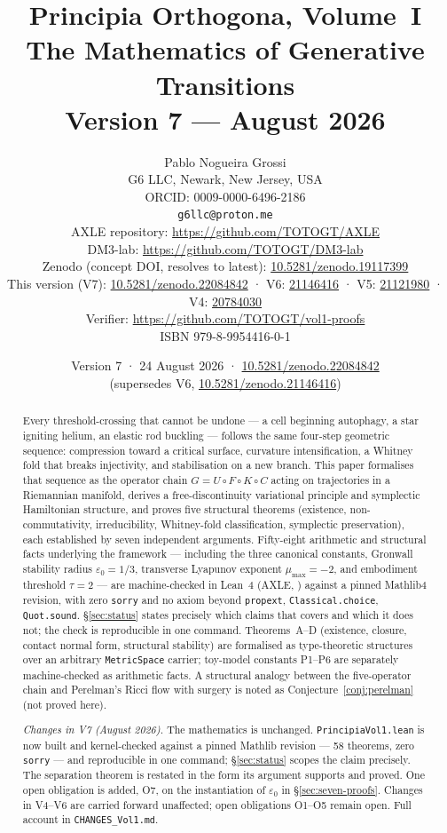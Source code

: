 \documentclass[14pt,a4paper]{extarticle}
\title{%
  \textbf{Principia Orthogona, Volume~I}\\[0.3em]
  \textbf{The Mathematics of Generative Transitions}\\[0.5em]
  \large Version 7 --- August 2026%
}
\author{%
  Pablo Nogueira Grossi\\
  G6 LLC, Newark, New Jersey, USA\\
  ORCID: 0009-0000-6496-2186\\
  \texttt{g6llc@proton.me}\\[0.3em]
  \small AXLE repository: \url{https://github.com/TOTOGT/AXLE}\\
  \small DM3-lab: \url{https://github.com/TOTOGT/DM3-lab}\\
  \small Zenodo (concept DOI, resolves to latest): \href{https://doi.org/10.5281/zenodo.19117399}{10.5281/zenodo.19117399}\\
  \small This version (V7): \href{https://doi.org/10.5281/zenodo.22084842}{10.5281/zenodo.22084842} ·
  V6: \href{https://doi.org/10.5281/zenodo.21146416}{21146416} ·
  V5: \href{https://doi.org/10.5281/zenodo.21121980}{21121980} ·
  V4: \href{https://doi.org/10.5281/zenodo.20784030}{20784030}\\
  \small Verifier: \url{https://github.com/TOTOGT/vol1-proofs}\\
  \small ISBN 979-8-9954416-0-1%
}
\date{Version 7 · 24 August 2026 ·
  \href{https://doi.org/10.5281/zenodo.22084842}{10.5281/zenodo.22084842}\\
  \small (supersedes V6, \href{https://doi.org/10.5281/zenodo.21146416}{10.5281/zenodo.21146416})}
\begin{document}
\maketitle

\begin{abstract}
Every threshold-crossing that cannot be undone ---
a cell beginning autophagy, a star igniting helium, an elastic rod buckling ---
follows the same four-step geometric sequence: compression toward a critical
surface, curvature intensification, a Whitney fold that breaks injectivity,
and stabilisation on a new branch.
This paper formalises that sequence as the operator chain
$G = U \circ F \circ K \circ C$ acting on trajectories in a Riemannian manifold,
derives a free-discontinuity variational principle and symplectic Hamiltonian
structure, and proves five structural theorems (existence, non-commutativity,
irreducibility, Whitney-fold classification, symplectic preservation),
each established by seven independent arguments.
Fifty-eight arithmetic and structural facts underlying the framework ---
including the three canonical constants,
Gronwall stability radius $\varepsilon_0 = 1/3$,
transverse Lyapunov exponent $\mu_{\max} = -2$,
and embodiment threshold $\tau = 2$ ---
are machine-checked in Lean~4 (AXLE, \cite{AXLE2026})
against a pinned Mathlib4 revision, with zero \texttt{sorry} and no axiom
beyond \texttt{propext}, \texttt{Classical.choice}, \texttt{Quot.sound}.
\S\ref{sec:status} states precisely which claims that covers and which it
does not; the check is reproducible in one command.
Theorems~A--D (existence, closure, contact normal form, structural stability)
are formalised as type-theoretic structures over an arbitrary
\texttt{MetricSpace} carrier; toy-model constants P1--P6 are separately
machine-checked as arithmetic facts.
A structural analogy between the five-operator chain and Perelman's Ricci
flow with surgery is noted as Conjecture~\ref{conj:perelman} (not proved here).

\bigskip
\noindent\textit{Changes in V7 (August 2026).}
The mathematics is unchanged. \texttt{PrincipiaVol1.lean} is now built and
kernel-checked against a pinned Mathlib revision --- 58 theorems, zero
\texttt{sorry} --- and reproducible in one command; \S\ref{sec:status} scopes
the claim precisely. The separation theorem is restated in the form its
argument supports and proved. One open obligation is added, O7, on the
instantiation of $\varepsilon_0$ in \S\ref{sec:seven-proofs}. Changes in
V4--V6 are carried forward unaffected; open obligations O1--O5 remain open.
Full account in \texttt{CHANGES\_Vol1.md}.
\end{abstract}
\end{document}
